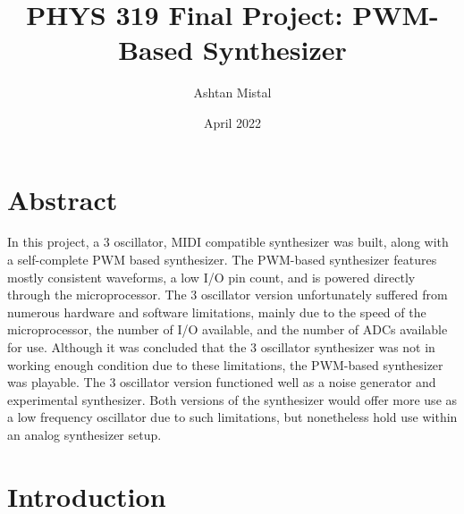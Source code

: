 \documentclass[12pt]{article}
\title{PHYS 319 Final Project: PWM-Based Synthesizer}
\author{Ashtan Mistal}
\date{April 2022}
\begin{document}
\maketitle

\break
\begin{singlespace}
\tableofcontents{}
\end{singlespace}

\break



\section{Abstract}\label{sec:abstract}

In this project, a 3 oscillator, MIDI compatible synthesizer was built, along with a self-complete PWM based synthesizer. The PWM-based synthesizer features mostly consistent waveforms, a low I/O pin count, and is powered directly through the microprocessor. The 3 oscillator version unfortunately suffered from numerous hardware and software limitations, mainly due to the speed of the microprocessor, the number of I/O available, and the number of ADCs available for use. Although it was concluded that the 3 oscillator synthesizer was not in working enough condition due to these limitations, the PWM-based synthesizer was playable. The 3 oscillator version functioned well as a noise generator and experimental synthesizer. Both versions of the synthesizer would offer more use as a low frequency oscillator due to such limitations, but nonetheless hold use within an analog synthesizer setup. 


\section{Introduction}\label{sec:introduction}
\end{document}
